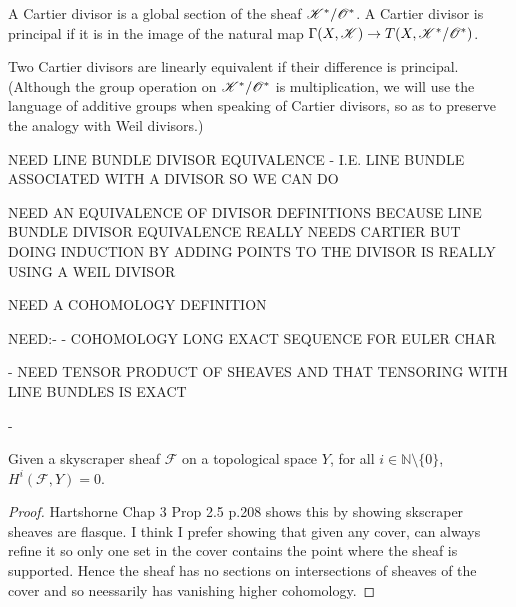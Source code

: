 \begin{definition}[Hartshorne p.141]\label{def:cartierdivisor}
A Cartier divisor is a global section of the sheaf $\mathscr{K}^* / \mathscr{O}^*$.
A Cartier divisor is principal if it is in the image of the natural map
$\Gamma(X,\mathscr{K}) \rightarrow T(X, \mathscr{K}^* / \mathscr{O}^*)$.

Two Cartier divisors are linearly equivalent if their difference is principal.
(Although the group operation on $\mathscr{K}^* / \mathscr{O}^*$ is multiplication,
we will use the language of additive groups when speaking of Cartier divisors,
so as to preserve the analogy with Weil divisors.)
\end{definition}

NEED LINE BUNDLE DIVISOR EQUIVALENCE - I.E. LINE BUNDLE
ASSOCIATED WITH A DIVISOR SO WE CAN DO

NEED AN EQUIVALENCE OF DIVISOR DEFINITIONS BECAUSE LINE BUNDLE
DIVISOR EQUIVALENCE REALLY NEEDS CARTIER BUT DOING INDUCTION BY
ADDING POINTS TO THE DIVISOR IS REALLY USING A WEIL DIVISOR


NEED A COHOMOLOGY DEFINITION

NEED:-
- COHOMOLOGY LONG EXACT SEQUENCE FOR EULER CHAR

- NEED TENSOR PRODUCT OF SHEAVES AND
THAT TENSORING WITH LINE BUNDLES IS EXACT

-



\begin{lemma}\label{lem:skyscrapervanishing}
Given a skyscraper sheaf $\mathscr{F}$ on a topological space $Y$,
for all $i \in \mathbb{N} \setminus \{0\}$, $H^i(\mathscr{F}, Y) = 0$.
\end{lemma}
\begin{proof}
Hartshorne Chap 3 Prop 2.5 p.208 shows this by showing skscraper sheaves are flasque.
I think I prefer showing that given any cover, can always refine it so only one set
in the cover contains the point where the sheaf is supported. Hence the sheaf
has no sections on intersections of sheaves of the cover and so neessarily has
vanishing higher cohomology.
\end{proof}

